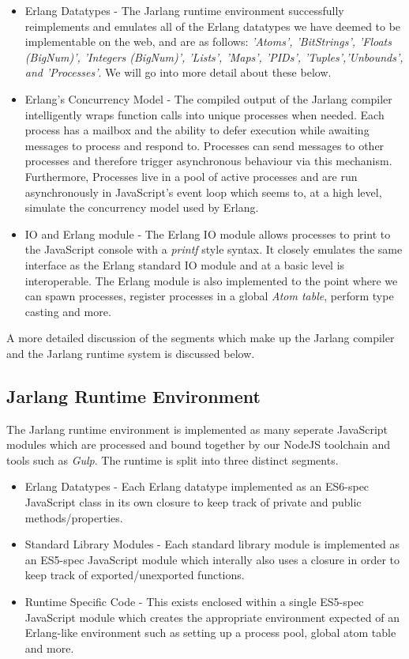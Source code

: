 \documentclass[twoside,12pt,titlepage,a4paper]{article}
\begin{document}
\begin{itemize}
\item Erlang Datatypes - The Jarlang runtime environment successfully reimplements and emulates all of the Erlang datatypes we have deemed to be implementable on the web, and are as follows: \textit{'Atoms', 'BitStrings', 'Floats (BigNum)', 'Integers (BigNum)', 'Lists', 'Maps', 'PIDs', 'Tuples','Unbounds', and 'Processes'}. We will go into more detail about these below.
\item Erlang's Concurrency Model - The compiled output of the Jarlang compiler intelligently wraps function calls into unique processes when needed. Each process has a mailbox and the ability to defer execution while awaiting messages to process and respond to. Processes can send messages to other processes and therefore trigger asynchronous behaviour via this mechanism. Furthermore, Processes live in a pool of active processes and are run asynchronously in JavaScript's event loop which seems to, at a high level, simulate the concurrency model used by Erlang.
\item IO and Erlang module - The Erlang IO module allows processes to print to the JavaScript console with a \textit{printf} style syntax. It closely emulates the same interface as the Erlang standard IO module and at a basic level is interoperable. The Erlang module is also implemented to the point where we can spawn processes, register processes in a global \textit{Atom table}, perform type casting and more.
\end{itemize}

A more detailed discussion of the segments which make up the Jarlang compiler and the Jarlang runtime system is discussed below.

\subsection{Jarlang Runtime Environment}
The Jarlang runtime environment is implemented as many seperate JavaScript modules which are processed and bound together by our NodeJS toolchain and tools such as \textit{Gulp}. The runtime is split into three distinct segments.

\begin{itemize}
\item Erlang Datatypes - Each Erlang datatype implemented as an ES6-spec JavaScript class in its own closure to keep track of private and public methods/properties.
\item Standard Library Modules - Each standard library module is implemented as an ES5-spec JavaScript module which interally also uses a closure in order to keep track of exported/unexported functions.
\item Runtime Specific Code - This exists enclosed within a single ES5-spec JavaScript module which creates the appropriate environment expected of an Erlang-like environment such as setting up a process pool, global atom table and more.
\end{itemize}
\end{document}
